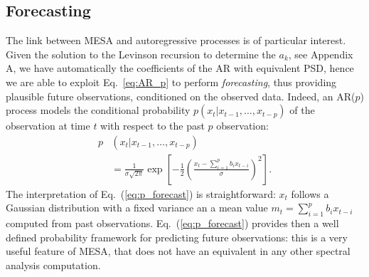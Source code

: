 \documentclass[twocolumn,showpacs,preprintnumbers,nofootinbib,prd,
superscriptaddress,10pt]{revtex4-1}
\begin{document}

\subsection{Forecasting} \label{sec:forecasting}
The link between MESA and autoregressive processes is of particular interest. Given the solution to the Levinson recursion to determine the $a_k$, see Appendix A, we have automatically the coefficients of the AR with equivalent PSD, hence we are able to exploit Eq.~\ref{eq:AR_p} to perform \emph{forecasting}, thus providing plausible future observations, conditioned on the observed data.
Indeed, an AR($p$) process models the conditional probability $p(x_t|x_{t-1}, \ldots , x_{t-p})$ of the observation at time $t$ with respect to the past $p$ observation:
\begin{align}\label{eq:p_forecast}
	p&(x_t|x_{t-1}, \ldots , x_{t-p}) \nonumber\\
	&= \frac{1}{\sigma\sqrt{2\pi}} \exp\left[-\frac{1}{2} \left(\frac{x_t - \sum_{i = 1}^p b_i x_{t-i}}{\sigma}\right)^2\right].
\end{align}
The interpretation of Eq.~(\ref{eq:p_forecast}) is straightforward: $x_t$ follows a Gaussian distribution with a fixed variance an a mean value $m_t = \sum_{i = 1}^p b_i x_{t-i}$ computed from past observations.
Eq.~(\ref{eq:p_forecast}) provides then a well defined probability framework for predicting future observations: this is a very useful feature of MESA, that does not have an equivalent in any other spectral analysis computation.
\end{document}
